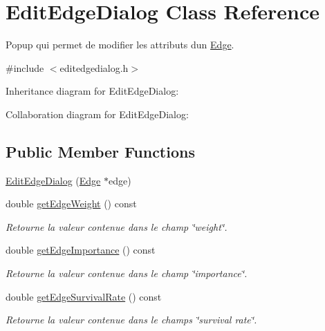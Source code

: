 \hypertarget{class_edit_edge_dialog}{}\section{Edit\+Edge\+Dialog Class Reference}
\label{class_edit_edge_dialog}


Popup qui permet de modifier les attributs d\textquotesingle{}un \mbox{\hyperlink{class_edge}{Edge}}.  




{\ttfamily \#include $<$editedgedialog.\+h$>$}



Inheritance diagram for Edit\+Edge\+Dialog\+:


Collaboration diagram for Edit\+Edge\+Dialog\+:
\subsection*{Public Member Functions}
\begin{DoxyCompactItemize}
\item 
\mbox{\hyperlink{class_edit_edge_dialog_a2c74f6de2329989a559918ebd60b31b0}{Edit\+Edge\+Dialog}} (\mbox{\hyperlink{class_edge}{Edge}} $\ast$edge)
\item 
double \mbox{\hyperlink{class_edit_edge_dialog_a0342c98517f14a49fd2f40d01e400154}{get\+Edge\+Weight}} () const
\begin{DoxyCompactList}\small\item\em Retourne la valeur contenue dans le champ \char`\"{}weight\char`\"{}. \end{DoxyCompactList}\item 
double \mbox{\hyperlink{class_edit_edge_dialog_a0a22d131d347363511e010557581f60b}{get\+Edge\+Importance}} () const
\begin{DoxyCompactList}\small\item\em Retourne la valeur contenue dans le champ \char`\"{}importance\char`\"{}. \end{DoxyCompactList}\item 
double \mbox{\hyperlink{class_edit_edge_dialog_a211adaab8e8221e69cbc8e3e3f19f83a}{get\+Edge\+Survival\+Rate}} () const
\begin{DoxyCompactList}\small\item\em Retourne la valeur contenue dans le champs \char`\"{}survival rate\char`\"{}. \end{DoxyCompactList}\end{DoxyCompactItemize}



